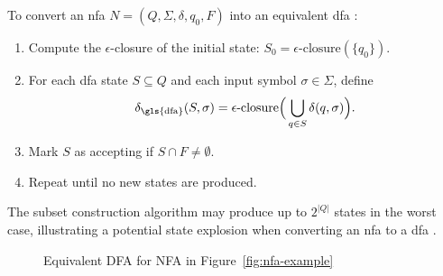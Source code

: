 \begin{algorithm}
\label{alg:subset}
To convert an \gls{nfa} \( N = (Q, \Sigma, \delta, q_0, F) \) into an equivalent \gls{dfa} \cite{hopcroft2006introduction, kozen1997automata}:
\begin{enumerate}
    \item Compute the \(\epsilon\)-closure of the initial state: \( S_0 = \epsilon\text{-closure}(\{q_0\}) \).
    \item For each \gls{dfa} state \( S \subseteq Q \) and each input symbol \(\sigma \in \Sigma\), define 
    \[
    \delta_{\text{\gls{dfa}}}(S, \sigma) = \epsilon\text{-closure}\Big(\bigcup_{q \in S} \delta(q, \sigma)\Big).
    \]
    \item Mark \( S \) as accepting if \( S \cap F \neq \emptyset \).
    \item Repeat until no new states are produced.
\end{enumerate}
\end{algorithm}

\begin{observation}
    The subset construction algorithm may produce up to \(2^{|Q|}\) states in the worst case, illustrating a potential state explosion when converting an \gls{nfa} to a \gls{dfa} \cite{sipser2013introduction}.
\end{observation}

\begin{figure}[ht]
    \centering  
    \caption{Equivalent DFA for NFA in Figure~\ref{fig:nfa-example} \cite{hopcroft2006introduction}}
    \label{fig:dfa-conversion}
\end{figure}